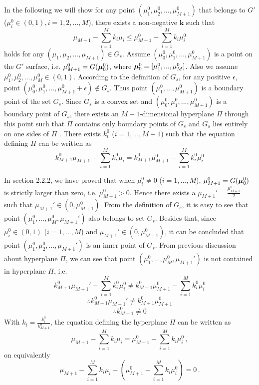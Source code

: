 In the following we will show for any point $(\mu_1^0, \mu_2^0, ..., \mu_{M+1}^0)$ that belongs to $G'$ ($\mu_i^0 \in (0, 1), i = 1, 2, ..., M$), there exists a non-negative $\mathbf{k}$ such that  
\[
\mu_{M+1} - \sum_{i=1}^{M}k_i\mu_i \leq \mu_{M+1}^0 - \sum_{i=1}^{M}k_i\mu_i^0
\]
holds for any $(\mu_1, \mu_2, ..., \mu_{M+1}) \in G_s$. 
Assume $(\mu_0^0, \mu_1^0, ..., \mu_{M+1}^0)$ is a point on the $G'$ surface, i.e. $\mu_{M+1}^0 = G(\boldsymbol{\mu}_0^0)$, where $\boldsymbol{\mu}_0^0 = [\mu_1^0, ..., \mu_{M}^0]$. 
Also we assume $\mu_1^0, \mu_2^0, ..., \mu_M^0 \in (0, 1)$. 
According to the definition of $G_s$, for any positive $\epsilon$, point $(\mu_0^0, \mu_1^0, ..., \mu_{M+1}^0+\epsilon) \notin G_s$. Thus point $(\mu_1^0, ..., \mu_{M+1}^0)$ is a boundary point of the set $G_s$.  
Since $G_s$ is a convex set and $(\mu_0^0, \mu_1^0, ..., \mu_{M+1}^0)$ is a boundary point of $G_s$,  
there exists an $M+1$-dimensional hyperplane $\Pi$ through this point such that $\Pi$ contains only boundary points of $G_s$ and $G_s$ lies entirely on one sides of $\Pi$  \cite{dantzig1951fundamental}. 
There exists $k_i^0$ ($i=1, ..., M+1$) such that the equation defining $\Pi$ can be written as \cite{dantzig1951fundamental}
\begin{equation}
\label{PI}
k_{M+1}^0\mu_{M+1} - \sum_{i=1}^{M}k_i^0\mu_i = k_{M+1}^0\mu_{M+1}^0 - \sum_{i=1}^{M}k_i^0\mu_i^0
\end{equation}

In section 2.2.2, we have proved that when $\mu^0_i\neq 0$ ($i=1, ..., M$), $\mu_{M+1}^0 = G(\boldsymbol{\mu}_0^0) $ is strictly larger than zero, i.e. $\mu_{M+1}^0 > 0$. Hence there exists a $\mu_{M+1}' = \frac{\mu_{M+1}^0}{2}$ such that $\mu_{M+1}' \in (0, \mu_{M+1}^0)$. From the definition of $G_s$, it is easy to see that point $(\mu^0_1, ..., \mu^0_M, \mu_{M+1}')$ also belongs to set $G_s$. Besides that, since $\mu^0_i \in (0, 1)$ ($i=1, ..., M$) and $\mu_{M+1}' \in (0, \mu_{M+1}^0)$, it can be concluded that point $(\mu_1^0, \mu_2^0, ..., \mu_{M+1}')$ is an inner point of $G_s$.
From previous discussion about hyperplane $\Pi$, we can see that point $(\mu^0_1, ..., \mu^0_M, \mu_{M+1}')$ is not contained in hyperplane $\Pi$, i.e.
\[
k_{M+1}^0\mu_{M+1}' - \sum_{i=1}^{M}k_i^0\mu_i^0 \neq k_{M+1}^0\mu_{M+1}^0 - \sum_{i=1}^{M}k_i^0\mu_i^0
\]
\[
\therefore k_{M+1}^0\mu_{M+1}' \neq k_{M+1}^0\mu_{M+1}^0
\]
\[
\therefore k_{M+1}^0 \neq 0
\]
With $k_i = \frac{k_i^0}{k_{M+1}^0}$, the equation defining the hyperplane $\Pi$ can be written as
\begin{equation}
\label{PI2}
\mu_{M+1} - \sum_{i=1}^{M}k_i\mu_i = \mu_{M+1}^0 - \sum_{i=1}^{M}k_i\mu_i^0\,,
\end{equation}
on equivalently 
\begin{equation}
\label{PI2b}
\mu_{M+1} - \sum_{i=1}^{M}k_i\mu_i - (\mu_{M+1}^0 - \sum_{i=1}^{M}k_i\mu_i^0) = 0\,.
\end{equation}

